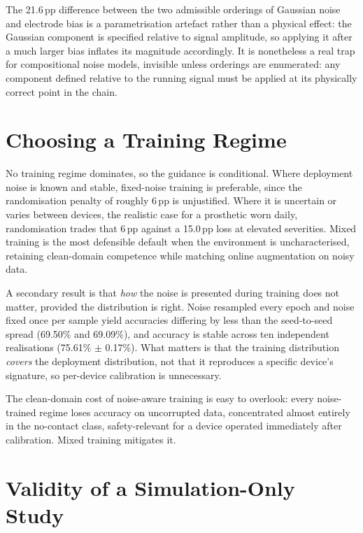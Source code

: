 The 21.6\,pp difference between the two admissible orderings of Gaussian noise and electrode bias is a parametrisation artefact rather than a physical effect: the Gaussian component is specified relative to signal amplitude, so applying it after a much larger bias inflates its magnitude accordingly. It is nonetheless a real trap for compositional noise models, invisible unless orderings are enumerated: any component defined relative to the running signal must be applied at its physically correct point in the chain.

\section{Choosing a Training Regime}
\label{sec:disc-tradeoff}

No training regime dominates, so the guidance is conditional. Where deployment noise is known and stable, fixed-noise training is preferable, since the randomisation penalty of roughly 6\,pp is unjustified. Where it is uncertain or varies between devices, the realistic case for a prosthetic worn daily, randomisation trades that 6\,pp against a 15.0\,pp loss at elevated severities. Mixed training is the most defensible default when the environment is uncharacterised, retaining clean-domain competence while matching online augmentation on noisy data.

A secondary result is that \emph{how} the noise is presented during training does not matter, provided the distribution is right. Noise resampled every epoch and noise fixed once per sample yield accuracies differing by less than the seed-to-seed spread (69.50\% and 69.09\%), and accuracy is stable across ten independent realisations (75.61\% $\pm$ 0.17\%). What matters is that the training distribution \emph{covers} the deployment distribution, not that it reproduces a specific device's signature, so per-device calibration is unnecessary.

The clean-domain cost of noise-aware training is easy to overlook: every noise-trained regime loses accuracy on uncorrupted data, concentrated almost entirely in the no-contact class, safety-relevant for a device operated immediately after calibration. Mixed training mitigates it.

\section{Validity of a Simulation-Only Study}
\label{sec:disc-approx-error}


